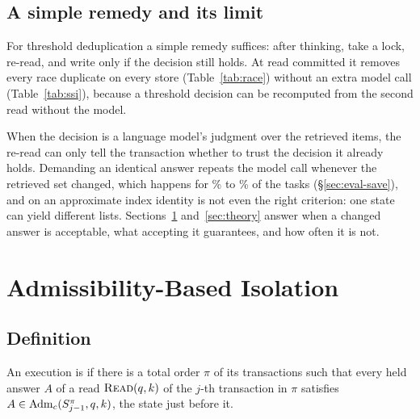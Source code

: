 \documentclass[sigconf, nonacm, review]{acmart}
\begin{document}
\subsection{A simple remedy and its limit}
\label{sec:baseline}

For threshold deduplication a simple remedy suffices: after thinking,
take a lock, re-read, and write only if the decision still holds. At
read committed it removes every race duplicate on every store
(Table~\ref{tab:race}) without an extra model call
(Table~\ref{tab:ssi}), because a threshold decision can be recomputed
from the second read without the model.

When the decision is a language model's judgment over the retrieved
items, the re-read can only tell the transaction whether to trust the
decision it already holds. Demanding an identical answer repeats the
model call whenever the retrieved set changed, which happens for
\% to \% of the tasks
(\S\ref{sec:eval-save}), and on an approximate index identity is not
even the right criterion: one state can yield different lists. Sections~\ref{sec:semantics} and~\ref{sec:theory} answer when a changed answer is
acceptable, what accepting it guarantees, and how often it is not.

\section{Admissibility-Based Isolation}
\label{sec:semantics}

\subsection{Definition}

\begin{definition}[$c$-serializability]
\label{def:cser}
An execution is \emph{\cser{}} if there is a total order $\pi$ of its
transactions such that every held answer $A$ of a read $\textsc{Read}(q,k)$
of the $j$-th transaction in $\pi$ satisfies
$A\in\mathrm{Adm}_c(S^\pi_{j-1},q,k)$, the state just before it.
\end{definition}
\end{document}
